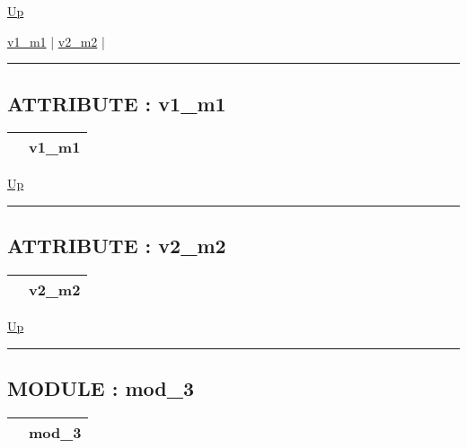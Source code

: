 \hyperlink{ecldoc:intest.in1intest.example_2}{Up}

\par


\hyperlink{ecldoc:intest.in1intest.example_2.mod_2.v1_m1}{v1\_m1}  |
\hyperlink{ecldoc:intest.in1intest.example_2.mod_2.v2_m2}{v2\_m2}  |

\rule{\textwidth}{0.4pt}

\subsection*{ATTRIBUTE : v1\_m1}
\hypertarget{ecldoc:intest.in1intest.example_2.mod_2.v1_m1}{}

{\renewcommand{\arraystretch}{1.5}
\begin{tabularx}{\textwidth}{|>{\raggedright\arraybackslash}l|X|}
\hline
\hspace{0pt} & v1\_m1 \\
\hline
\end{tabularx}
}

\hyperlink{ecldoc:intest.in1intest.example_2.mod_2}{Up}

\par


\rule{\textwidth}{0.4pt}
\subsection*{ATTRIBUTE : v2\_m2}
\hypertarget{ecldoc:intest.in1intest.example_2.mod_2.v2_m2}{}

{\renewcommand{\arraystretch}{1.5}
\begin{tabularx}{\textwidth}{|>{\raggedright\arraybackslash}l|X|}
\hline
\hspace{0pt} & v2\_m2 \\
\hline
\end{tabularx}
}

\hyperlink{ecldoc:intest.in1intest.example_2.mod_2}{Up}

\par


\rule{\textwidth}{0.4pt}


\subsection*{MODULE : mod\_3}
\hypertarget{ecldoc:intest.in1intest.example_2.mod_3}{}

{\renewcommand{\arraystretch}{1.5}
\begin{tabularx}{\textwidth}{|>{\raggedright\arraybackslash}l|X|}
\hline
\hspace{0pt} & mod\_3 \\
\hline
\end{tabularx}
}

